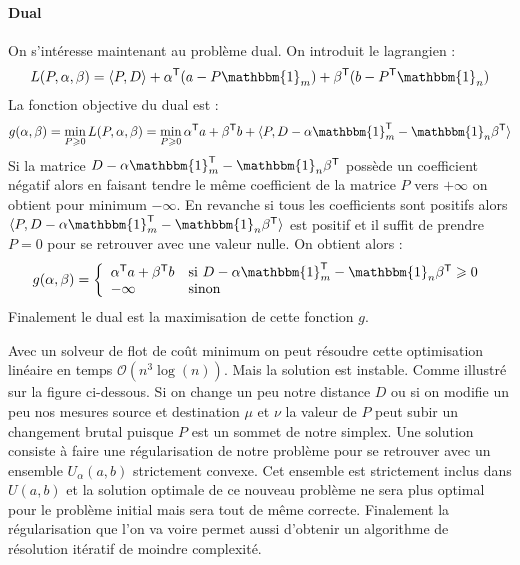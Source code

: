 
\paragraph{Dual} On s'intéresse maintenant au problème dual. On introduit le lagrangien :
$$ L(P, \alpha, \beta) = \langle P, D \rangle + \alpha^\trans (a - P \mathbbm{1}_m) + \beta^\trans (b - P^\trans \mathbbm{1}_n) $$
La fonction objective du dual est :
$$ g(\alpha, \beta) = \min_{P \geqslant 0} L(P, \alpha, \beta) = \min_{P \geqslant 0} \alpha^\trans a + \beta^\trans b + \langle P, D - \alpha \mathbbm{1}_m^\trans - \mathbbm{1}_n \beta^\trans \rangle $$
Si la matrice $D - \alpha \mathbbm{1}_m^\trans - \mathbbm{1}_n \beta^\trans$ possède un coefficient négatif alors en faisant tendre le même coefficient de la matrice $P$ vers $+\infty$ on obtient pour minimum $-\infty$. En revanche si tous les coefficients sont positifs alors $\langle P, D - \alpha \mathbbm{1}_m^\trans - \mathbbm{1}_n \beta^\trans \rangle$ est positif et il suffit de prendre $P=0$ pour se retrouver avec une valeur nulle. On obtient alors :
$$ g(\alpha, \beta) = \left\{ \begin{array}{ll}
\alpha^\trans a + \beta^\trans b & \text{si } D - \alpha \mathbbm{1}_m^\trans - \mathbbm{1}_n \beta^\trans \geqslant 0 \\
-\infty & \text{sinon}
\end{array}\right. $$
Finalement le dual est la maximisation de cette fonction $g$.


Avec un solveur de flot de coût minimum on peut résoudre cette optimisation linéaire en temps $\mathcal{O}(n^3 \log (n))$. Mais la solution est instable. Comme illustré sur la figure ci-dessous. Si on change un peu notre distance $D$ ou si on modifie un peu nos mesures source et destination $\mu$ et $\nu$ la valeur de $P$ peut subir un changement brutal puisque $P$ est un sommet de notre simplex. Une solution consiste à faire une régularisation de notre problème pour se retrouver avec un ensemble $U_\alpha(a, b)$ strictement convexe. Cet ensemble est strictement inclus dans $U(a, b)$ et la solution optimale de ce nouveau problème ne sera plus optimal pour le problème initial mais sera tout de même correcte. Finalement la régularisation que l'on va voire permet aussi d'obtenir un algorithme de résolution itératif de moindre complexité.

